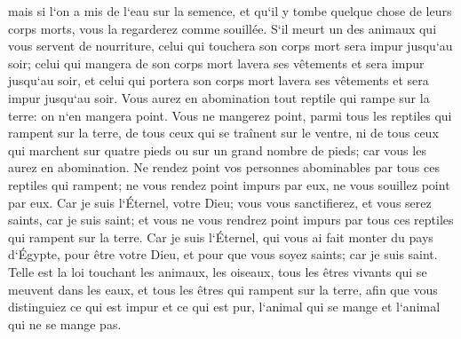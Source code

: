 \verse mais si l`on a mis de l`eau sur la semence, et qu`il y tombe quelque chose de leurs corps morts, vous la regarderez comme souillée. 
\verse S`il meurt un des animaux qui vous servent de nourriture, celui qui touchera son corps mort sera impur jusqu`au soir; 
\verse celui qui mangera de son corps mort lavera ses vêtements et sera impur jusqu`au soir, et celui qui portera son corps mort lavera ses vêtements et sera impur jusqu`au soir. 
\verse Vous aurez en abomination tout reptile qui rampe sur la terre: on n`en mangera point. 
\verse Vous ne mangerez point, parmi tous les reptiles qui rampent sur la terre, de tous ceux qui se traînent sur le ventre, ni de tous ceux qui marchent sur quatre pieds ou sur un grand nombre de pieds; car vous les aurez en abomination. 
\verse Ne rendez point vos personnes abominables par tous ces reptiles qui rampent; ne vous rendez point impurs par eux, ne vous souillez point par eux. 
\verse Car je suis l`Éternel, votre Dieu; vous vous sanctifierez, et vous serez saints, car je suis saint; et vous ne vous rendrez point impurs par tous ces reptiles qui rampent sur la terre. 
\verse Car je suis l`Éternel, qui vous ai fait monter du pays d`Égypte, pour être votre Dieu, et pour que vous soyez saints; car je suis saint. 
\verse Telle est la loi touchant les animaux, les oiseaux, tous les êtres vivants qui se meuvent dans les eaux, et tous les êtres qui rampent sur la terre, 
\verse afin que vous distinguiez ce qui est impur et ce qui est pur, l`animal qui se mange et l`animal qui ne se mange pas. 

